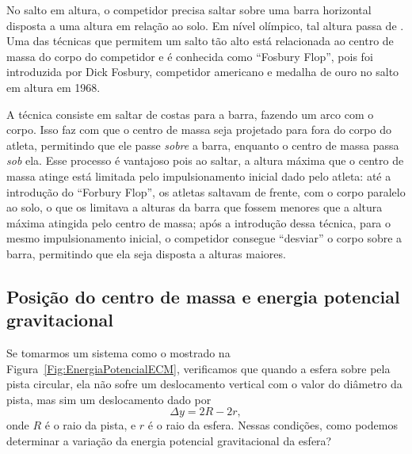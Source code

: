 No salto em altura, o competidor precisa saltar sobre uma barra horizontal disposta a uma altura em relação ao solo. Em nível olímpico, tal altura passa de . Uma das técnicas que permitem um salto tão alto está relacionada ao centro de massa do corpo do competidor e é conhecida como ``Fosbury Flop'', pois foi introduzida por Dick Fosbury, competidor americano e medalha de ouro no salto em altura em 1968.

A técnica consiste em saltar de costas para a barra, fazendo um arco com o corpo. Isso faz com que o centro de massa seja projetado para fora do corpo do atleta, permitindo que ele passe \emph{sobre} a barra, enquanto o centro de massa passa \emph{sob} ela. Esse processo é vantajoso pois ao saltar, a altura máxima que o centro de massa atinge está limitada pelo impulsionamento inicial dado pelo atleta: até a introdução do ``Forbury Flop'', os atletas saltavam de frente, com o corpo paralelo ao solo, o que os limitava a alturas da barra que fossem menores que a altura máxima atingida pelo centro de massa; após a introdução dessa técnica, para o mesmo impulsionamento inicial, o competidor consegue ``desviar'' o corpo sobre a barra, permitindo que ela seja disposta a alturas maiores.

\subsection{Posição do centro de massa e energia potencial gravitacional}

Se tomarmos um sistema como o mostrado na Figura~\eqref{Fig:EnergiaPotencialECM}, verificamos que quando a esfera sobre pela pista circular, ela não sofre um deslocamento vertical com o valor do diâmetro da pista, mas sim um deslocamento dado por
\begin{equation}
    \Delta y = 2R - 2r,
\end{equation}
%
onde $R$ é o raio da pista, e $r$ é o raio da esfera. Nessas condições, como podemos determinar a variação da energia potencial gravitacional da esfera?

